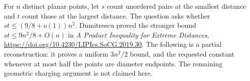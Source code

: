 For $n$ distinct planar points, let $s$ count unordered pairs at the smallest distance and $t$ count those at the largest distance. The question asks whether $st\le(9/8+o(1))n^2$. Dumitrescu proved the stronger bound $st\le9n^2/8+O(n)$ in \emph{A Product Inequality for Extreme Distances}, \url{https://doi.org/10.4230/LIPIcs.SoCG.2019.30}. The following is a partial reconstruction: it proves a uniform $3n^2/2$ bound, and the requested constant whenever at most half the points are diameter endpoints. The remaining geometric charging argument is not claimed here.
